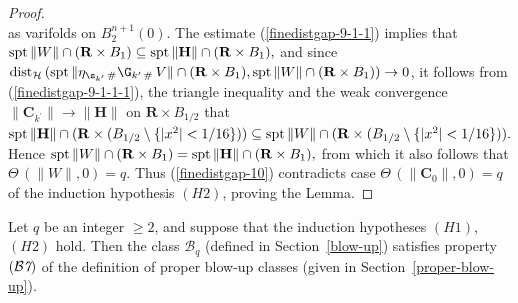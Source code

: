 \documentclass[a4paper,11pt]{amsart}
\begin{document}
\begin{proof}
\begin{equation}
\end{equation}
as varifolds on $B_{2}^{n+1}(0)$. The estimate (\ref{finedistgap-9-1-1}) implies that ${\rm spt} \, \|W\|\cap ({\mathbf R} \times B_{1}) \subseteq {\rm spt} \,\|{\mathbf H}\| \cap ({\mathbf R} \times B_{1}),$  and since 
${\rm dist}_{\mathcal H} \, ({\rm spt} \, \|\eta_{\s_{k^{\prime}} \, \#} \G_{k^{\prime} \, \#} \, V\| \cap ({\mathbf R} \times B_{1}), {\rm spt} \, \|W\| \cap ({\mathbf R} \times B_{1})) \to 0$, it follows from (\ref{finedistgap-9-1-1-1}), the triangle inequality and the weak convergence $\|{\mathbf C}_{k^{\prime}}\| \to \|{\mathbf H}\|$ on ${\mathbf R} \times B_{1/2}$ that 
${\rm spt} \, \|{\mathbf H}\| \cap ({\mathbf R} \times (B_{1/2} \setminus \{|x^{2}| < 1/16\})) \subseteq {\rm spt} \, \|W\| \cap ({\mathbf R} \times (B_{1/2} \setminus \{|x^{2}| < 1/16\})).$ Hence 
${\rm spt} \, \|W\| \cap ({\mathbf R} \times B_{1}) = {\rm spt} \, \|{\mathbf H}\| \cap ({\mathbf R} \times B_{1}),$ from which it also follows that $\Theta \, (\|W\|, 0) = q.$ Thus  (\ref{finedistgap-10}) contradicts case $\Theta \, (\|{\mathbf C}_{0}\|, 0) = q$ of the induction hypothesis $(H2)$, proving the Lemma.
\end{proof}


\begin{corollary}\label{F7}
Let $q$ be an integer $\geq 2$, and suppose that the induction hypotheses $(H1)$, $(H2)$ hold. Then 
the class ${\mathcal B}_{q}$ (defined in Section~\ref{blow-up}) satisfies property $({\mathcal B{\emph 7}})$ of the definition of proper blow-up classes (given in Section~\ref{proper-blow-up}). 
\end{corollary}
\end{document}
